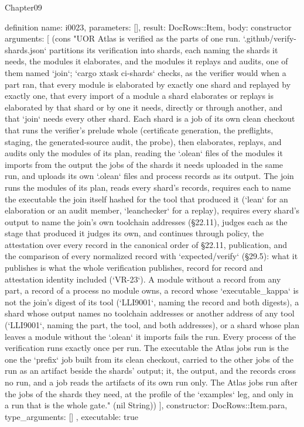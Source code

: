 \begin{lexlean}{Chapter09}
\begin{semanticmodule}
definition{
  name: i0023,
  parameters: [],
  result: DocRows::Item,
  body: constructor{
    arguments: [
      (cons "UOR Atlas is verified as the parts of one run. `.github/verify-shards.json` partitions its verification into shards, each naming the shards it needs, the modules it elaborates, and the modules it replays and audits, one of them named `join`; `cargo xtask ci-shards` checks, as the verifier would when a part ran, that every module is elaborated by exactly one shard and replayed by exactly one, that every import of a module a shard elaborates or replays is elaborated by that shard or by one it needs, directly or through another, and that `join` needs every other shard. Each shard is a job of its own clean checkout that runs the verifier's prelude whole (certificate generation, the preflights, staging, the generated-source audit, the probe), then elaborates, replays, and audits only the modules of its plan, reading the `.olean` files of the modules it imports from the output the jobs of the shards it needs uploaded in the same run, and uploads its own `.olean` files and process records as its output. The join runs the modules of its plan, reads every shard's records, requires each to name the executable the join itself hashed for the tool that produced it (`lean` for an elaboration or an audit member, `leanchecker` for a replay), requires every shard's output to name the join's own toolchain addresses (§22.11), judges each as the stage that produced it judges its own, and continues through policy, the attestation over every record in the canonical order of §22.11, publication, and the comparison of every normalized record with `expected/verify` (§29.5): what it publishes is what the whole verification publishes, record for record and attestation identity included (`VR-23`). A module without a record from any part, a record of a process no module owns, a record whose `executable_kappa` is not the join's digest of its tool (`LLI9001`, naming the record and both digests), a shard whose output names no toolchain addresses or another address of any tool (`LLI9001`, naming the part, the tool, and both addresses), or a shard whose plan leaves a module without the `.olean` it imports fails the run. Every process of the verification runs exactly once per run. The executable the Atlas jobs run is the one the `prefix` job built from its clean checkout, carried to the other jobs of the run as an artifact beside the shards' output; it, the output, and the records cross no run, and a job reads the artifacts of its own run only. The Atlas jobs run after the jobs of the shards they need, at the profile of the `examples` leg, and only in a run that is the whole gate." (nil String))
    ],
    constructor: DocRows::Item.para,
    type_arguments: []
  },
  executable: true
}


\end{semanticmodule}
\end{lexlean}
